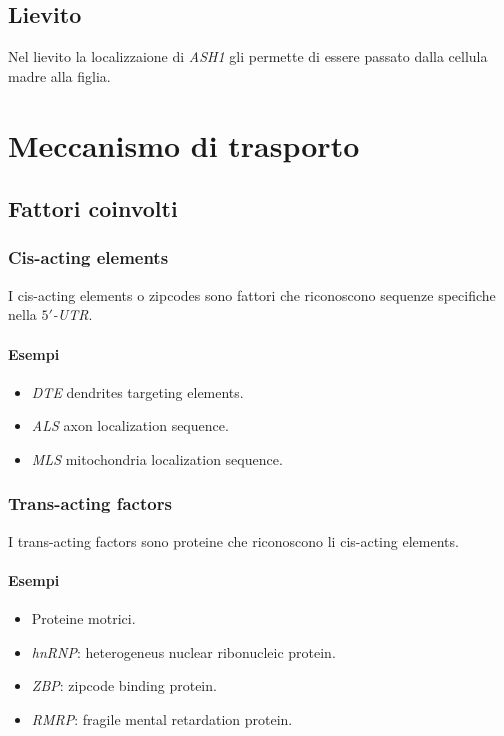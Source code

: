 	\subsection{Lievito}
	Nel lievito la localizzaione di \emph{ASH1} gli permette di essere passato dalla cellula madre alla figlia.

\section{Meccanismo di trasporto}

	\subsection{Fattori coinvolti}

		\subsubsection{Cis-acting elements}
		I cis-acting elements o zipcodes sono fattori che riconoscono sequenze specifiche nella \emph{$5'$-UTR}.
		
			\paragraph{Esempi}
			\begin{multicols}{2}
				\begin{itemize}
					\item \emph{DTE} dendrites targeting elements.
					\item \emph{ALS} axon localization sequence.
					\item \emph{MLS} mitochondria localization sequence.
				\end{itemize}
			\end{multicols}
	
		\subsubsection{Trans-acting factors}
		I trans-acting factors sono proteine che riconoscono li cis-acting elements.
		
			\paragraph{Esempi}
			\begin{multicols}{2}
				\begin{itemize}
					\item Proteine motrici.
					\item \emph{hnRNP}: heterogeneus nuclear ribonucleic protein.
					\item \emph{ZBP}: zipcode binding protein.
					\item \emph{RMRP}: fragile mental retardation protein.
				\end{itemize}
			\end{multicols}

